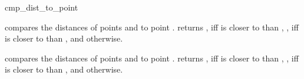 \begin{ccRefFunction}{cmp_dist_to_point}

          {compares the distances of points  and
            to point .
          returns , iff  is closer
          to  than , , iff
           is closer to  than , and
           otherwise.}


          {compares the distances of points  and
            to point .
          returns , iff  is closer
          to  than , , iff
           is closer to  than , and
           otherwise.}
\end{ccRefFunction}

